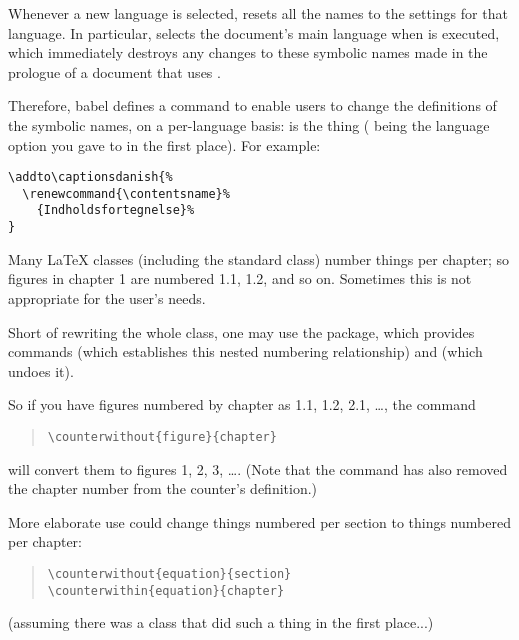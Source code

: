 Whenever a new language is selected,  resets all the
names to the settings for that language.  In particular,
 selects the document's main language when
 is executed, which immediately destroys
any changes to these symbolic names made in the prologue of a document
that uses . 

Therefore, babel defines a command to enable users to change the
definitions of the symbolic names, on a per-language basis:
\texttt{} is the thing
(\texttt{} being the language option you gave to
 in the first place).  For example:
\begin{verbatim}
\addto\captionsdanish{%
  \renewcommand{\contentsname}%
    {Indholdsfortegnelse}%
}
\end{verbatim}


Many \LaTeX{} classes (including the standard  class)
number things per chapter; so figures in chapter 1 are numbered 1.1,
1.2, and so on.  Sometimes this is not appropriate for the user's
needs.

Short of rewriting the whole class, one may use the 
package, which provides commands  (which
establishes this nested numbering relationship) and
 (which undoes it).

So if you have figures numbered by chapter as 1.1, 1.2, 2.1, \dots{},
the command 
\begin{quote}
\begin{verbatim}
\counterwithout{figure}{chapter}
\end{verbatim}
\end{quote}
will convert them to figures 1, 2, 3, \dots{}.  (Note that the command
has also removed the chapter number from the counter's definition.)

More elaborate use could change things numbered per section to things
numbered per chapter:
\begin{quote}
\begin{verbatim}
\counterwithout{equation}{section}
\counterwithin{equation}{chapter}
\end{verbatim}
\end{quote}
(assuming there was a class that did such a thing in the first place...)

